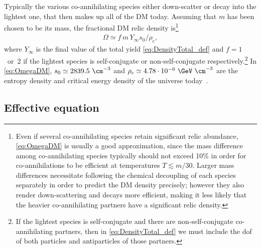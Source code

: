 \documentclass[preprint,5p,twocolumn]{elsarticle}
\begin{document}
Typically the various co-annihilating species either down-scatter or decay into the lightest one, that then makes up all of the DM today. Assuming that $m$ has been chosen to be its mass, the fractional DM relic density is\footnote{
Even if several co-annihilating species retain significant relic abundance, \cref{eq:OmegaDM} is usually a good approximation, since the mass difference among co-annihilating species typically should not exceed 10\% in order for co-annihilations to be efficient at temperatures $T \lesssim m/30$. Larger mass differences necessitate following the chemical decoupling of each species separately in order to predict the DM density precisely; however they also render down-scattering and decays more efficient, making it less likely that the heavier co-annihilating partners have a significant relic density.}
%
\begin{align}
\Omega \simeq f \, m \, Y_\infty s_0 / \rho_c, 
\label{eq:OmegaDM}
\end{align} 
%
where $Y_\infty$ is the final value of the total yield \eqref{eq:DensityTotal_def} and $f = 1$~or~2 if the lightest species is self-conjugate or non-self-conjugate respectively.\footnote{If the lightest species is self-conjugate and there are non-self-conjugate co-annihilating partners, then in \cref{eq:DensityTotal_def} we must include the dof of both particles and antiparticles of those partners.} 
In \cref{eq:OmegaDM}, $s_0 \simeq 2839.5~\cm^{-3}$ and $\rho_c \simeq 4.78 \cdot 10^{-6}~\GeV~\cm^{-3}$ are the entropy density and critical energy density of the universe today~\cite{Aghanim:2018eyx}.





\subsection{Effective equation \label{sec:BoltzmannEqs_Effective}}
\end{document}

